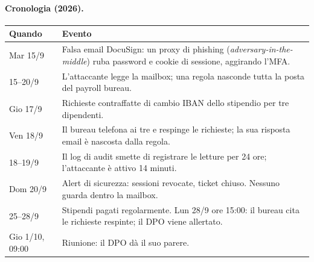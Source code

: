 \paragraph{Cronologia (2026).}
\begin{center}
\small
\begin{tabularx}{\linewidth}{p{2.3cm} X}
\toprule
\textbf{Quando} & \textbf{Evento} \\ \midrule
Mar 15/9 & Falsa email DocuSign: un proxy di phishing (\emph{adversary-in-the-middle}) ruba password e
  cookie di sessione, aggirando l'MFA. \\
15--20/9 & L'attaccante legge la mailbox; una regola nasconde tutta la posta del payroll bureau. \\
Gio 17/9 & Richieste contraffatte di cambio IBAN dello stipendio per tre dipendenti. \\
Ven 18/9 & Il bureau telefona ai tre e respinge le richieste; la sua risposta email è nascosta
  dalla regola. \\
18--19/9 & Il log di audit smette di registrare le letture per 24 ore; l'attaccante è attivo 14
  minuti. \\
Dom 20/9 & Alert di sicurezza: sessioni revocate, ticket chiuso. Nessuno guarda dentro la mailbox. \\
25--28/9 & Stipendi pagati regolarmente. Lun 28/9 ore 15:00: il bureau cita le richieste respinte;
  il DPO viene allertato. \\
Gio 1/10, 09:00 & Riunione: il DPO dà il suo parere. \\
\bottomrule
\end{tabularx}
\end{center}


